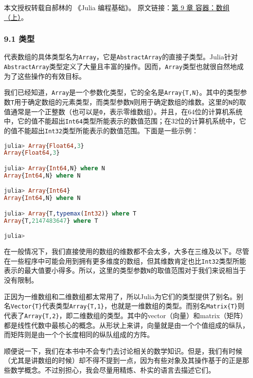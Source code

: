 
本文授权转载自郝林的 《Julia 编程基础》。 原文链接：\href{https://github.com/hyper0x/JuliaBasics/blob/master/book/ch09.md}{第 9 章 容器：数组（上）}。


\subsubsection{9.1 类型}

代表数组的具体类型名为\verb`Array`，它是\verb`AbstractArray`的直接子类型。Julia针对\verb`AbstractArray`类型定义了大量且丰富的操作。因而，\verb`Array`类型也就很自然地成为了这些操作的有效目标。

我们已经知道，\verb`Array`是一个参数化类型，它的全名是\verb`Array{T,N}`。其中的类型参数\verb`T`用于确定数组的元素类型，而类型参数\verb`N`则用于确定数组的维数。这里的\verb`N`的取值通常是一个正整数（也可以是\verb`0`，表示零维数组）。并且，在64位的计算机系统中，它的值不能超出\verb`Int64`类型所能表示的数值范围；在32位的计算机系统中，它的值不能超出\verb`Int32`类型所能表示的数值范围。下面是一些示例：

\begin{lstlisting}[language=julia]
julia> Array{Float64,3}
Array{Float64,3}

julia> Array{Int64,N} where N
Array{Int64,N} where N

julia> Array{Int64}
Array{Int64,N} where N

julia> Array{T,typemax(Int32)} where T
Array{T,2147483647} where T

julia> 
\end{lstlisting}

在一般情况下，我们直接使用的数组的维数都不会太多，大多在三维及以下。尽管在一些程序中可能会用到拥有更多维度的数组，但其维数肯定也比\verb`Int32`类型所能表示的最大值要小得多。所以，这里的类型参数\verb`N`的取值范围对于我们来说相当于没有限制。

正因为一维数组和二维数组都太常用了，所以Julia为它们的类型提供了别名。别名\verb`Vector{T}`代表类型\verb`Array{T,1}`，也就是一维数组的类型。而别名\verb`Matrix{T}`则代表了\verb`Array{T,2}`，即二维数组的类型。其中的vector（向量）和matrix（矩阵）都是线性代数中最核心的概念。从形状上来讲，向量就是由一个个值组成的纵队，而矩阵则是由一个个长度相同的纵队组成的方阵。

顺便说一下，我们在本书中不会专门去讨论相关的数学知识。但是，我们有时候（尤其是讲数组的时候）却不得不提到一点，因为有些对象及其操作基于的正是那些数学概念。不过别担心，我会尽量用精炼、朴实的语言去描述它们。

